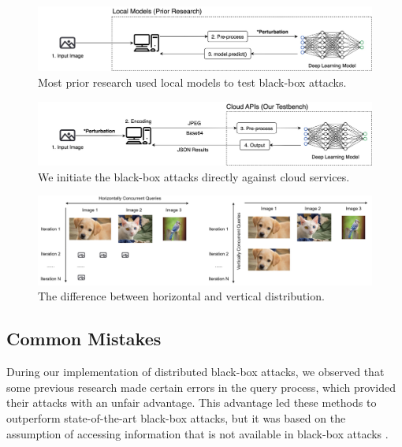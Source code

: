 \begin{figure}[btph]
    \centering
    \includegraphics[width=0.9\linewidth]{figures/chapter_classification/local.jpg}
    \caption{Most prior research used local models to test black-box attacks.}
    \label{fig:local}
\end{figure}

\begin{figure}[btph]
    \centering
    \includegraphics[width=0.9\linewidth]{figures/chapter_classification/cloudapi.jpg}
    \caption{We initiate the black-box attacks directly against cloud services.}
    \label{fig:cloudapi}
\end{figure}

\begin{figure}[btph]
    \centering
    \includegraphics[width=0.9\linewidth]{figures/chapter_classification/distribution.jpg}
    \caption{The difference between horizontal and vertical distribution.}
    \label{fig:distributability}
\end{figure}

\subsection{Common Mistakes}
\label{common_errors}


During our implementation of distributed black-box attacks, we observed that some previous research made certain errors in the query process, which provided their attacks with an unfair advantage. This advantage led these methods to outperform state-of-the-art black-box attacks, but it was based on the assumption of accessing information that is not available in black-box attacks \cite{ilyas2018black}\cite{ilyas2018prior}\cite{guo2019simple}\cite{Brunner_2019}\cite{moon2019parsimonious}\cite{andriushchenko2020square}.

